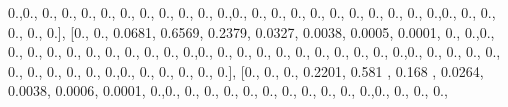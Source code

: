 \documentclass[
]{book}
\newenvironment{Shaded}{\begin{snugshade}}{\end{snugshade}}
\newcommand{\FloatTok}[1]{\textcolor[rgb]{0.00,0.00,0.81}{#1}}
\newcommand{\NormalTok}[1]{#1}
\begin{document}
\begin{Shaded}
\begin{Highlighting}[]
\FloatTok{0.}\NormalTok{,}\FloatTok{0.}\NormalTok{, }\FloatTok{0.}\NormalTok{, }\FloatTok{0.}\NormalTok{, }\FloatTok{0.}\NormalTok{, }\FloatTok{0.}\NormalTok{, }\FloatTok{0.}\NormalTok{, }\FloatTok{0.}\NormalTok{, }\FloatTok{0.}\NormalTok{, }\FloatTok{0.}\NormalTok{, }\FloatTok{0.}\NormalTok{, }\FloatTok{0.}\NormalTok{,}\FloatTok{0.}\NormalTok{, }\FloatTok{0.}\NormalTok{, }\FloatTok{0.}\NormalTok{, }\FloatTok{0.}\NormalTok{, }\FloatTok{0.}\NormalTok{, }\FloatTok{0.}\NormalTok{, }\FloatTok{0.}\NormalTok{, }\FloatTok{0.}\NormalTok{,}
\FloatTok{0.}\NormalTok{, }\FloatTok{0.}\NormalTok{, }\FloatTok{0.}\NormalTok{,}\FloatTok{0.}\NormalTok{, }\FloatTok{0.}\NormalTok{, }\FloatTok{0.}\NormalTok{, }\FloatTok{0.}\NormalTok{, }\FloatTok{0.}\NormalTok{, }\FloatTok{0.}\NormalTok{], [}\FloatTok{0.}\NormalTok{, }\FloatTok{0.}\NormalTok{, }\FloatTok{0.0681}\NormalTok{, }\FloatTok{0.6569}\NormalTok{, }\FloatTok{0.2379}\NormalTok{, }\FloatTok{0.0327}\NormalTok{,}
\FloatTok{0.0038}\NormalTok{, }\FloatTok{0.0005}\NormalTok{, }\FloatTok{0.0001}\NormalTok{, }\FloatTok{0.}\NormalTok{, }\FloatTok{0.}\NormalTok{,}\FloatTok{0.}\NormalTok{, }\FloatTok{0.}\NormalTok{, }\FloatTok{0.}\NormalTok{, }\FloatTok{0.}\NormalTok{, }\FloatTok{0.}\NormalTok{, }\FloatTok{0.}\NormalTok{, }\FloatTok{0.}\NormalTok{, }\FloatTok{0.}\NormalTok{, }\FloatTok{0.}\NormalTok{, }\FloatTok{0.}\NormalTok{, }\FloatTok{0.}\NormalTok{,}\FloatTok{0.}\NormalTok{,}
\FloatTok{0.}\NormalTok{, }\FloatTok{0.}\NormalTok{, }\FloatTok{0.}\NormalTok{, }\FloatTok{0.}\NormalTok{, }\FloatTok{0.}\NormalTok{, }\FloatTok{0.}\NormalTok{, }\FloatTok{0.}\NormalTok{, }\FloatTok{0.}\NormalTok{, }\FloatTok{0.}\NormalTok{, }\FloatTok{0.}\NormalTok{,}\FloatTok{0.}\NormalTok{, }\FloatTok{0.}\NormalTok{, }\FloatTok{0.}\NormalTok{, }\FloatTok{0.}\NormalTok{, }\FloatTok{0.}\NormalTok{, }\FloatTok{0.}\NormalTok{, }\FloatTok{0.}\NormalTok{, }\FloatTok{0.}\NormalTok{, }\FloatTok{0.}\NormalTok{, }\FloatTok{0.}\NormalTok{,}
\FloatTok{0.}\NormalTok{,}\FloatTok{0.}\NormalTok{, }\FloatTok{0.}\NormalTok{, }\FloatTok{0.}\NormalTok{, }\FloatTok{0.}\NormalTok{, }\FloatTok{0.}\NormalTok{, }\FloatTok{0.}\NormalTok{], [}\FloatTok{0.}\NormalTok{, }\FloatTok{0.}\NormalTok{, }\FloatTok{0.}\NormalTok{, }\FloatTok{0.2201}\NormalTok{, }\FloatTok{0.581}\NormalTok{ , }\FloatTok{0.168}\NormalTok{ , }\FloatTok{0.0264}\NormalTok{, }\FloatTok{0.0038}\NormalTok{,}
\FloatTok{0.0006}\NormalTok{, }\FloatTok{0.0001}\NormalTok{, }\FloatTok{0.}\NormalTok{,}\FloatTok{0.}\NormalTok{, }\FloatTok{0.}\NormalTok{, }\FloatTok{0.}\NormalTok{, }\FloatTok{0.}\NormalTok{, }\FloatTok{0.}\NormalTok{, }\FloatTok{0.}\NormalTok{, }\FloatTok{0.}\NormalTok{, }\FloatTok{0.}\NormalTok{, }\FloatTok{0.}\NormalTok{, }\FloatTok{0.}\NormalTok{, }\FloatTok{0.}\NormalTok{,}\FloatTok{0.}\NormalTok{, }\FloatTok{0.}\NormalTok{, }\FloatTok{0.}\NormalTok{, }\FloatTok{0.}\NormalTok{,}

\end{Highlighting}
\end{Shaded}
\end{document}
